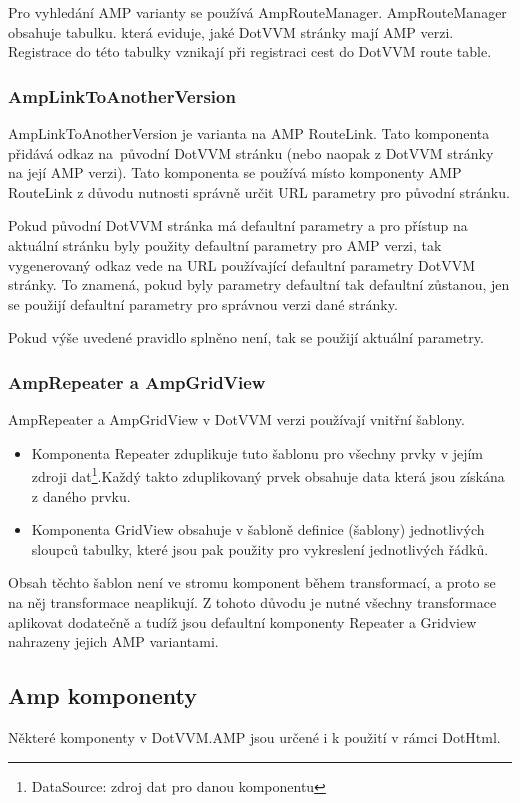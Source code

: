 Pro vyhledání AMP varianty se používá AmpRouteManager. AmpRouteManager obsahuje tabulku. která eviduje, jaké DotVVM stránky mají AMP verzi. Registrace do této tabulky vznikají při registraci cest do DotVVM route table.

\subsubsection*{AmpLinkToAnotherVersion}
AmpLinkToAnotherVersion je varianta na AMP RouteLink. Tato komponenta přidává odkaz na~původní DotVVM stránku (nebo naopak z DotVVM stránky na její AMP verzi). Tato komponenta se používá místo komponenty AMP RouteLink z důvodu nutnosti správně určit URL parametry pro původní stránku.

Pokud původní DotVVM stránka má defaultní parametry a pro přístup na aktuální stránku byly použity defaultní parametry pro AMP verzi, tak vygenerovaný odkaz vede na URL používající defaultní parametry DotVVM stránky. To znamená, pokud byly parametry defaultní tak defaultní zůstanou, jen se použijí defaultní parametry pro správnou verzi dané stránky.

Pokud výše uvedené pravidlo splněno není, tak se použijí aktuální parametry.

\subsubsection*{AmpRepeater a AmpGridView}
AmpRepeater a AmpGridView v DotVVM verzi používají vnitřní šablony.

\begin{itemize}
    \item Komponenta Repeater zduplikuje tuto šablonu pro všechny prvky v jejím zdroji dat\footnote{DataSource: zdroj dat pro danou komponentu}.Každý takto zduplikovaný prvek obsahuje data která jsou získána z daného prvku.
    \item Komponenta GridView obsahuje v šabloně definice (šablony) jednotlivých sloupců tabulky, které jsou pak použity pro vykreslení jednotlivých řádků.
\end{itemize}

Obsah těchto šablon není ve stromu komponent během transformací, a proto se na něj transformace neaplikují. Z tohoto důvodu je nutné všechny transformace aplikovat dodatečně a tudíž jsou defaultní komponenty Repeater a Gridview nahrazeny jejich AMP variantami.

\subsection*{Amp komponenty}
 Některé komponenty v DotVVM.AMP jsou určené i k použití v rámci DotHtml.
